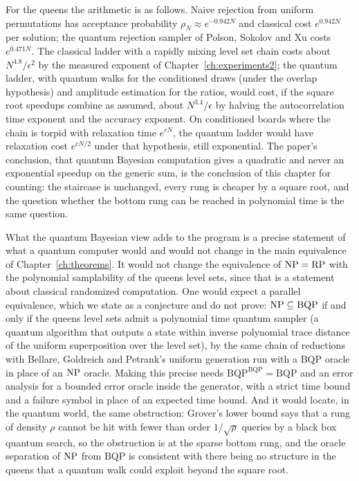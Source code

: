 For the queens the arithmetic is as follows. Naive rejection from uniform permutations has acceptance probability $\rho_N \approx e^{-0.942 N}$ and classical cost $e^{0.942 N}$ per solution; the quantum rejection sampler of Polson, Sokolov and Xu costs $e^{0.471 N}$. The classical ladder with a rapidly mixing level set chain costs about $N^{4.8} / \epsilon^2$ by the measured exponent of Chapter~\ref{ch:experiments2}; the quantum ladder, with quantum walks for the conditioned draws (under the overlap hypothesis) and amplitude estimation for the ratios, would cost, if the square root speedups combine as assumed, about $N^{3.4} / \epsilon$ by halving the autocorrelation time exponent and the accuracy exponent. On conditioned boards where the chain is torpid with relaxation time $e^{cN}$, the quantum ladder would have relaxation cost $e^{cN/2}$ under that hypothesis, still exponential. The paper's conclusion, that quantum Bayesian computation gives a quadratic and never an exponential speedup on the generic sum, is the conclusion of this chapter for counting: the staircase is unchanged, every rung is cheaper by a square root, and the question whether the bottom rung can be reached in polynomial time is the same question.

What the quantum Bayesian view adds to the program is a precise statement of what a quantum computer would and would not change in the main equivalence of Chapter~\ref{ch:theorems}. It would not change the equivalence of $\mathrm{NP} = \mathrm{RP}$ with the polynomial samplability of the queens level sets, since that is a statement about classical randomized computation. One would expect a parallel equivalence, which we state as a conjecture and do not prove: $\mathrm{NP} \subseteq \mathrm{BQP}$ if and only if the queens level sets admit a polynomial time quantum sampler (a quantum algorithm that outputs a state within inverse polynomial trace distance of the uniform superposition over the level set), by the same chain of reductions with Bellare, Goldreich and Petrank's uniform generation run with a $\mathrm{BQP}$ oracle in place of an $\mathrm{NP}$ oracle. Making this precise needs $\mathrm{BQP}^{\mathrm{BQP}} = \mathrm{BQP}$ and an error analysis for a bounded error oracle inside the generator, with a strict time bound and a failure symbol in place of an expected time bound. And it would locate, in the quantum world, the same obstruction: Grover's lower bound says that a rung of density $\rho$ cannot be hit with fewer than order $1/\sqrt{\rho}$ queries by a black box quantum search, so the obstruction is at the sparse bottom rung, and the oracle separation of $\mathrm{NP}$ from $\mathrm{BQP}$ is consistent with there being no structure in the queens that a quantum walk could exploit beyond the square root.


